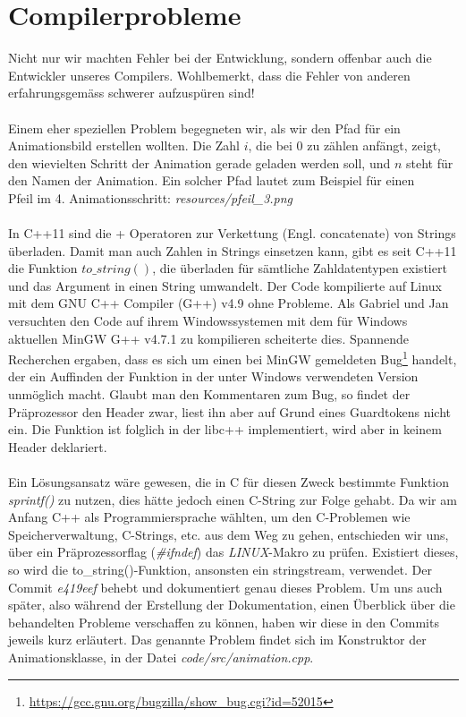 \documentclass[11pt,a4paper]{scrbook}
\begin{document}
\section{Compilerprobleme}
Nicht nur wir machten Fehler bei der Entwicklung, sondern offenbar auch die Entwickler unseres Compilers. Wohlbemerkt, dass die Fehler von anderen erfahrungsgemäss schwerer aufzuspüren sind!\\
\\
Einem eher speziellen Problem begegneten wir, als wir den Pfad für ein Animationsbild erstellen wollten.
Die Zahl $i$, die bei 0 zu zählen anfängt, zeigt, den wievielten Schritt der Animation gerade geladen werden soll, und $n$ steht für den Namen der Animation.
Ein solcher Pfad lautet zum Beispiel für einen\\Pfeil im 4. Animationsschritt: \textit{resources/pfeil\_3.png}\\
\\
In C++11 sind die + Operatoren zur Verkettung (Engl. concatenate) von Strings überladen. Damit man auch Zahlen in Strings einsetzen
kann, gibt es seit C++11 die Funktion $to\_string()$, die überladen für sämtliche Zahldatentypen existiert und das Argument in einen String
umwandelt. Der Code kompilierte auf Linux mit dem GNU C++ Compiler (G++) v4.9 ohne Probleme. Als Gabriel und Jan versuchten den Code auf ihrem Windowssystemen
mit dem für Windows aktuellen MinGW G++ v4.7.1 zu kompilieren scheiterte dies. Spannende Recherchen ergaben, dass es sich um einen bei MinGW gemeldeten Bug\footnote{\url{https://gcc.gnu.org/bugzilla/show_bug.cgi?id=52015}} handelt, der ein Auffinden der Funktion in der unter Windows verwendeten
Version unmöglich macht. Glaubt man den Kommentaren zum Bug, so findet der Präprozessor den Header zwar, liest ihn aber auf Grund eines Guardtokens nicht ein.
Die Funktion ist folglich in der libc++ implementiert, wird aber in keinem Header deklariert.\\ %
\\
Ein Lösungsansatz wäre gewesen, die in C für diesen Zweck bestimmte Funktion \textit{sprintf()} zu nutzen, dies hätte jedoch einen C-String zur Folge gehabt.
Da wir am Anfang C++ als Programmiersprache wählten, um den C-Problemen wie Speicherverwaltung, C-Strings, etc. aus dem Weg zu gehen, entschieden wir uns, über ein
Präprozessorflag (\textit{\#ifndef}) das \textit{LINUX}-Makro zu prüfen. Existiert dieses, so wird die to\_string()-Funktion, ansonsten ein stringstream, verwendet.
Der Commit \textit{e419eef} behebt und dokumentiert genau dieses Problem. Um uns auch später, also während der Erstellung der Dokumentation, einen Überblick
über die behandelten Probleme verschaffen zu können, haben wir diese in den Commits jeweils kurz erläutert. Das genannte Problem findet sich im
Konstruktor der Animationsklasse, in der Datei \textit{code/src/animation.cpp}.
\end{document}
